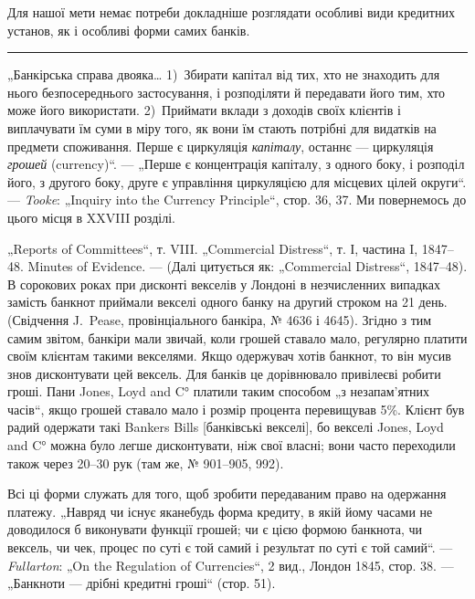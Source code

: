 Для нашої мети немає потреби докладніше розглядати особливі види кредитних установ, як і особливі
форми самих банків.

\pfbreak{}

„Банкірська справа двояка\dots{} 1)~Збирати капітал від тих, хто не знаходить
для нього безпосереднього застосування, і розподіляти й передавати його
тим, хто може його використати. 2)~Приймати вклади з доходів своїх клієнтів
і виплачувати їм суми в міру того, як вони їм стають потрібні для видатків
на предмети споживання. Перше є циркуляція \emph{капіталу}, останнє — циркуляція
\emph{грошей} (currency)“. — „Перше є концентрація капіталу, з одного боку, і розподіл його, з другого
боку, друге є управління циркуляцією для місцевих
цілей округи“. — \emph{Tooke}: „Inquiry into the Currency Principle“, стор. 36, 37. Ми
повернемось до цього місця в XXVIII розділі.

„Reports of Committees“, т. VIII. „Commercial Distress“, т. І, частина I, 1847--48.
Minutes of Evidence. — (Далі цитується як: „Commercial Distress“, 1847--48). В сорокових роках при
дисконті векселів у Лондоні в незчисленних випадках замість банкнот приймали векселі одного банку на
другий строком на 21 день.
(Свідчення J.~Pease, провінціального банкіра, № 4636 і 4645). Згідно з тим самим звітом, банкіри
мали звичай, коли грошей ставало мало, регулярно платити
своїм клієнтам такими векселями. Якщо одержувач хотів банкнот, то він мусив
знов дисконтувати цей вексель. Для банків це дорівнювало привілеєві робити
гроші. Пани Jones, Loyd and C° платили таким способом „з незапам’ятних часів“,
якщо грошей ставало мало і розмір процента перевищував 5\%. Клієнт був
радий одержати такі Bankers Bills [банківські векселі], бо векселі Jones, Loyd
and C° можна було легше дисконтувати, ніж свої власні; вони часто переходили також через 20--30 рук
(там же, № 901--905, 992).

Всі ці форми служать для того, щоб зробити передаваним право на одержання платежу. „Навряд чи існує
яканебудь форма кредиту, в якій йому часами
не доводилося б виконувати функції грошей; чи є цією формою банкнота, чи
вексель, чи чек, процес по суті є той самий і результат по суті є той самий“. — \emph{Fullarton}: „On the
Regulation of Currencies“, 2 вид., Лондон 1845, стор. 38. — „Банкноти — дрібні кредитні гроші“
(стор. 51).

